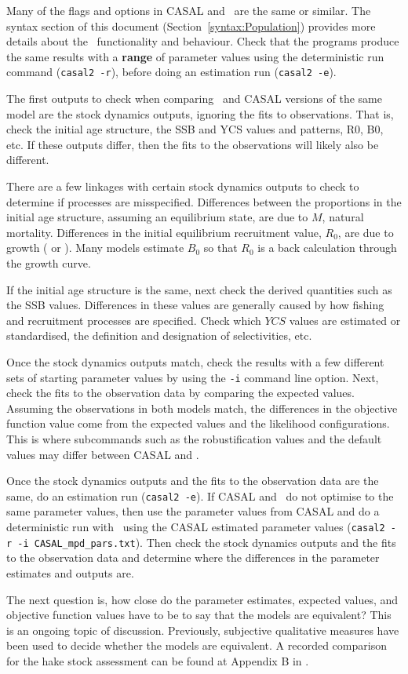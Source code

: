Many of the flags and options in CASAL and \CNAME\ are the same or similar. The syntax section of this document (Section~\ref{syntax:Population}) provides more details about the \CNAME\ functionality and behaviour. Check that the programs produce the same results with a \textbf{range} of parameter values using the deterministic run command (\texttt{casal2 -r}), before doing an estimation run (\texttt{casal2 -e}).

The first outputs to check when comparing \CNAME\ and CASAL versions of the same model are the stock dynamics outputs, ignoring the fits to observations. That is, check the initial age structure, the SSB and YCS values and patterns, R0, B0, etc. If these outputs differ, then the fits to the observations will likely also be different.

There are a few linkages with certain stock dynamics outputs to check to determine if processes are misspecified. Differences between the proportions in the initial age structure, assuming an equilibrium state, are due to $M$, natural mortality. Differences in the initial equilibrium recruitment value, $R_0$, are due to growth ( or ). Many models estimate $B_0$ so that $R_0$ is a back calculation through the growth curve.

If the initial age structure is the same, next check the derived quantities such as the SSB values. Differences in these values are generally caused by how fishing and recruitment processes are specified. Check which $YCS$ values are estimated or standardised, the definition and designation of selectivities, etc.

Once the stock dynamics outputs match, check the results with a few different sets of starting parameter values by using the \texttt{-i} command line option. Next, check the fits to the observation data by comparing the expected values.  Assuming the observations in both models match, the differences in the objective function value come from the expected values and the likelihood configurations. This is where subcommands such as the robustification values and the default values may differ between CASAL and \CNAME.

Once the stock dynamics outputs and the fits to the observation data are the same, do an estimation run (\texttt{casal2 -e}). If CASAL and \CNAME\ do not optimise to the same parameter values, then use the parameter values from CASAL and do a deterministic run with \CNAME\ using the CASAL estimated parameter values (\texttt{casal2 -r -i CASAL\_mpd\_pars.txt}). Then check the stock dynamics outputs and the fits to the observation data and determine where the differences in the parameter estimates and outputs are.

The next question is, how close do the parameter estimates, expected values, and objective function values have to be to say that the models are equivalent? This is an ongoing topic of discussion.  Previously, subjective qualitative measures have been used to decide whether the models are equivalent. A recorded comparison for the hake stock assessment can be found at Appendix B in \cite{horn2017stock}.







